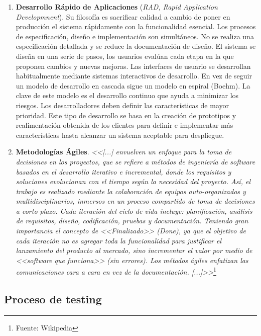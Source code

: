 \begin{enumerate}
\item \textbf{Desarrollo Rápido de Aplicaciones} (\emph{RAD, Rapid Application Developmnent}). Su filosofía es sacrificar calidad a cambio de poner en producción el sistema rápidamente con la funcionalidad esencial. Los procesos de especificación, diseño e implementación son simultáneos. No se realiza una especificación detallada y se reduce la documentación de diseño. El sistema se diseña en una serie de pasos, los usuarios evalúan cada etapa en la que proponen cambios y nuevas mejoras. Las interfaces de usuario se desarrollan habitualmente mediante sistemas interactivos de desarrollo. En vez de seguir un modelo de desarrollo en cascada sigue un modelo en espiral (Boehm). La clave de este modelo es el desarrollo continuo que ayuda a minimizar los riesgos. Los desarrolladores deben definir las características de mayor prioridad. Este tipo de desarrollo se basa en la creación de prototipos y realimentación obtenida de los clientes para definir e implementar más características hasta alcanzar un sistema aceptable para despliegue.

\item \textbf{Metodologías Ágiles}. \emph{<<[...] envuelven un enfoque para la toma de decisiones en los proyectos, que se refiere a métodos de ingeniería de software basados en el desarrollo iterativo e incremental, donde los requisitos y soluciones evolucionan con el tiempo según la necesidad del proyecto. Así, el trabajo es realizado mediante la colaboración de equipos auto-organizados y multidisciplinarios, inmersos en un proceso compartido de toma de decisiones a corto plazo. Cada iteración del ciclo de vida incluye:  planificación, análisis de requisitos, diseño, codificación, pruebas y  documentación. Teniendo gran importancia el concepto de <<Finalizado>> (Done), ya que el objetivo de cada iteración no es agregar toda la funcionalidad para justificar el lanzamiento del producto al mercado, sino incrementar el valor por medio de <<software que funciona>> (sin errores). Los métodos ágiles enfatizan las comunicaciones cara a cara en vez de la documentación. [...]>>}\footnote{Fuente: Wikipedia}
\end{enumerate}




\subsection{Proceso de testing}

